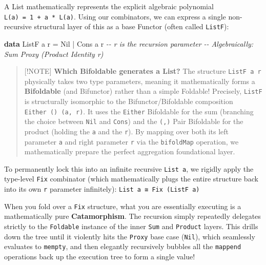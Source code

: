 \documentclass[
]{article}
\newenvironment{Shaded}{}{}
\newcommand{\CommentTok}[1]{\textcolor[rgb]{0.38,0.63,0.69}{\textit{#1}}}
\newcommand{\DataTypeTok}[1]{\textcolor[rgb]{0.56,0.13,0.00}{#1}}
\newcommand{\KeywordTok}[1]{\textcolor[rgb]{0.00,0.44,0.13}{\textbf{#1}}}
\newcommand{\NormalTok}[1]{#1}
\newcommand{\OperatorTok}[1]{\textcolor[rgb]{0.40,0.40,0.40}{#1}}
\newcommand{\OtherTok}[1]{\textcolor[rgb]{0.00,0.44,0.13}{#1}}
\begin{document}
A List mathematically represents the explicit algebraic polynomial
\texttt{L(a)\ =\ 1\ +\ a\ *\ L(a)}. Using our combinators, we can
express a single non-recursive structural layer of this as a base
Functor (often called \texttt{ListF}):

\begin{Shaded}
\begin{Highlighting}[]
\KeywordTok{data} \DataTypeTok{ListF}\NormalTok{ a r }\OtherTok{=} \DataTypeTok{Nil} \OperatorTok{|} \DataTypeTok{Cons}\NormalTok{ a r   }\CommentTok{{-}{-} \textquotesingle{}r\textquotesingle{} is the recursion parameter}
\CommentTok{{-}{-} Algebraically: Sum Proxy (Product Identity r)}
\end{Highlighting}
\end{Shaded}

\begin{quote}
{[}!NOTE{]} \textbf{Which Bifoldable generates a List?} The structure
\texttt{ListF\ a\ r} physically takes two type parameters, meaning it
mathematically forms a \textbf{Bifoldable} (and Bifunctor) rather than a
simple Foldable! Precisely, \texttt{ListF} is structurally isomorphic to
the Bifunctor/Bifoldable composition \texttt{Either\ ()\ (a,\ r)}. It
uses the \texttt{Either} Bifoldable for the sum (branching the choice
between \texttt{Nil} and \texttt{Cons}) and the \texttt{(,)} Pair
Bifoldable for the product (holding the \texttt{a} and the \texttt{r}).
By mapping over both its left parameter \texttt{a} and right parameter
\texttt{r} via the \texttt{bifoldMap} operation, we mathematically
prepare the perfect aggregation foundational layer.
\end{quote}

To permanently lock this into an infinite recursive \texttt{List\ a}, we
rigidly apply the type-level \texttt{Fix} combinator (which
mathematically plugs the entire structure back into its own \texttt{r}
parameter infinitely): \texttt{List\ a\ ≅\ Fix\ (ListF\ a)}

When you fold over a \texttt{Fix} structure, what you are essentially
executing is a mathematically pure \textbf{Catamorphism}. The recursion
simply repeatedly delegates strictly to the \texttt{Foldable} instance
of the inner \texttt{Sum} and \texttt{Product} layers. This drills down
the tree until it violently hits the \texttt{Proxy} base case
(\texttt{Nil}), which seamlessly evaluates to \texttt{mempty}, and then
elegantly recursively bubbles all the \texttt{mappend} operations back
up the execution tree to form a single value!
\end{document}

